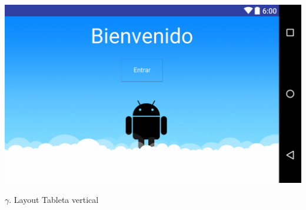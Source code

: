 \documentclass{article}
\begin{document}
\begin{center}

\includegraphics[scale=.15]{layout-2016-04-17-esp_layland.png} 

\end{center}

\newpage

$\gamma$. Layout Tableta vertical\
\end{document}
